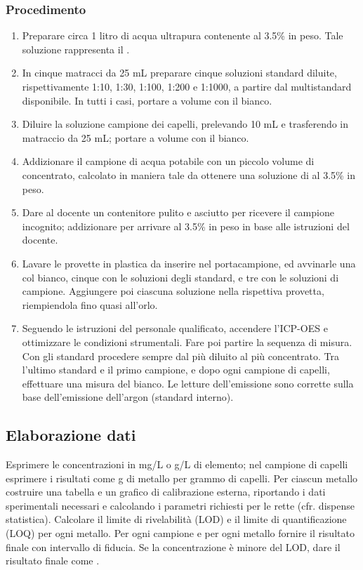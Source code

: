 \subsubsection{Procedimento}
\begin{enumerate}
\item Preparare circa 1 litro di acqua ultrapura contenente  al 3.5\% in peso. Tale soluzione rappresenta il .
\item In cinque matracci da 25 mL preparare cinque soluzioni standard diluite, rispettivamente 1:10, 1:30, 1:100, 1:200 e 1:1000, a partire dal multistandard disponibile. In tutti i casi, portare a volume con il bianco.
\item Diluire la soluzione campione dei capelli, prelevando 10 mL e trasferendo in matraccio da 25 mL; portare a volume con il bianco.
\item Addizionare il campione di acqua potabile con un piccolo volume di  concentrato, calcolato in maniera tale da ottenere una soluzione di  al 3.5\% in peso.
\item Dare al docente un contenitore pulito e asciutto per ricevere il campione incognito; addizionare  per arrivare al 3.5\% in peso in base alle istruzioni del docente.
\item Lavare le provette in plastica da inserire nel portacampione, ed avvinarle una col bianco, cinque con le soluzioni degli standard, e tre con le soluzioni di campione. Aggiungere poi ciascuna soluzione nella rispettiva provetta, riempiendola fino quasi all'orlo.
\item Seguendo le istruzioni del personale qualificato, accendere l'ICP-OES e ottimizzare le condizioni strumentali. Fare poi partire la sequenza di misura. Con gli standard procedere sempre dal più diluito al più concentrato. Tra l'ultimo standard e il primo campione, e dopo ogni campione di capelli, effettuare una misura del bianco. Le letture dell'emissione sono corrette sulla base dell'emissione dell'argon (standard interno).
\end{enumerate}

\subsection{Elaborazione dati}

Esprimere le concentrazioni in mg/L o \mu g/L di elemento; nel campione di capelli esprimere i risultati come \mu g di metallo per grammo di capelli. Per ciascun metallo costruire una tabella e un grafico di calibrazione esterna, riportando i dati sperimentali necessari e calcolando i parametri richiesti per le rette (cfr. dispense statistica). Calcolare il limite di rivelabilità (LOD) e il limite di quantificazione (LOQ) per ogni metallo. Per ogni campione e per ogni metallo fornire il risultato finale con intervallo di fiducia. Se la concentrazione è minore del LOD, dare il risultato finale come .

